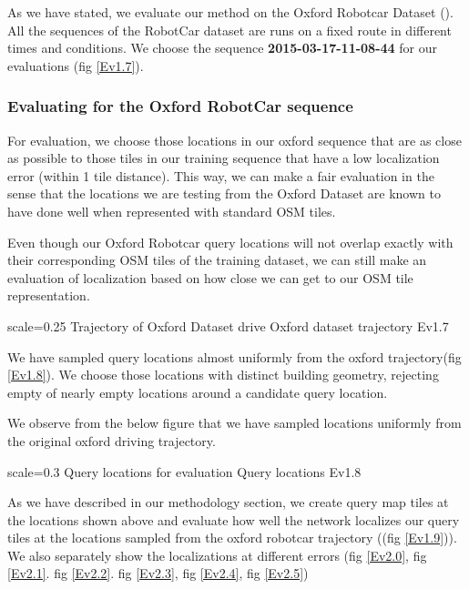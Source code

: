 As we have stated, we evaluate our method on the Oxford Robotcar Dataset (\textcite{newman2017}). All the sequences of the RobotCar dataset are runs on a fixed route in different times and conditions. We choose the sequence \textbf{2015-03-17-11-08-44} for our evaluations (fig \ref{Ev1.7}).

\subsubsection{Evaluating for the Oxford RobotCar sequence}
For evaluation, we choose those locations in our oxford sequence that are as close as possible to those tiles in our training sequence that have a low localization error (within 1 tile distance). This way, we can make a fair evaluation in the sense that the locations we are testing from the Oxford Dataset are known to have done well when represented with standard OSM tiles.

Even though our Oxford Robotcar query locations will not overlap exactly with their corresponding OSM tiles of the training dataset, we can still make an evaluation of localization based on how close we can get to our OSM tile representation.

{scale=0.25}%
{Trajectory of Oxford Dataset drive}%
{Oxford dataset trajectory}%
{Ev1.7}

We have sampled query locations almost uniformly from the oxford trajectory(fig \ref{Ev1.8}). We choose those locations with distinct building geometry, rejecting empty of nearly empty locations around a candidate query location.

We observe from the below figure that we have sampled locations uniformly from the original oxford driving trajectory. 

{scale=0.3}%
{Query locations for evaluation}%
{Query locations}%
{Ev1.8}

As we have described in our methodology section, we create query map tiles at the locations shown above and evaluate how well the network localizes our query tiles at the locations sampled from the oxford robotcar trajectory ((fig \ref{Ev1.9})). We also separately show the localizations at different errors (fig \ref{Ev2.0}, fig \ref{Ev2.1}. fig \ref{Ev2.2}. fig \ref{Ev2.3}, fig \ref{Ev2.4}, fig \ref{Ev2.5})

